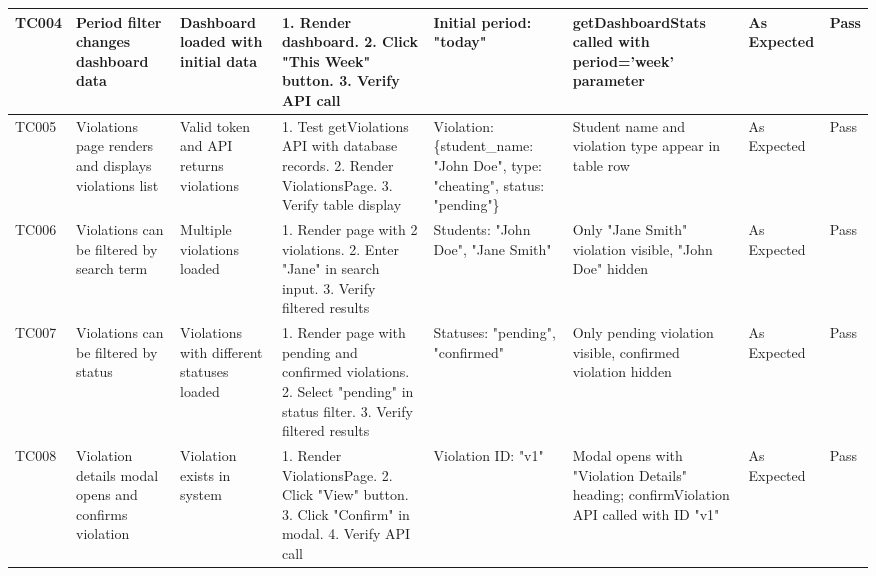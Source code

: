 \begin{table}[H]
{\begin{tabular}{|p{0.8cm}|p{1.8cm}|p{1.5cm}|p{2.5cm}|p{1.5cm}|p{2cm}|p{1.2cm}|p{0.8cm}|}
        \hline
        TC004 & Period filter changes dashboard data & Dashboard loaded with initial data & 1. Render dashboard. 
        2. Click "This Week" button. 
        3. Verify API call & Initial period: "today" & getDashboardStats called with period='week' parameter & As Expected & Pass \\
        \hline
        TC005 & Violations page renders and displays violations list & Valid token and API returns violations & 1. Test getViolations API with database records. 
        2. Render ViolationsPage. 
        3. Verify table display & Violation: \{student\_name: "John Doe", type: "cheating", status: "pending"\} & Student name and violation type appear in table row & As Expected & Pass \\
        \hline
        TC006 & Violations can be filtered by search term & Multiple violations loaded & 1. Render page with 2 violations. 
        2. Enter "Jane" in search input. 
        3. Verify filtered results & Students: "John Doe", "Jane Smith" & Only "Jane Smith" violation visible, "John Doe" hidden & As Expected & Pass \\
        \hline
        TC007 & Violations can be filtered by status & Violations with different statuses loaded & 1. Render page with pending and confirmed violations. 
        2. Select "pending" in status filter. 
        3. Verify filtered results & Statuses: "pending", "confirmed" & Only pending violation visible, confirmed violation hidden & As Expected & Pass \\
        \hline
        TC008 & Violation details modal opens and confirms violation & Violation exists in system & 1. Render ViolationsPage. 
        2. Click "View" button. 
        3. Click "Confirm" in modal. 
        4. Verify API call & Violation ID: "v1" & Modal opens with "Violation Details" heading; confirmViolation API called with ID "v1" & As Expected & Pass \\
\hline
    \end{tabular}%
    }
\end{table}
